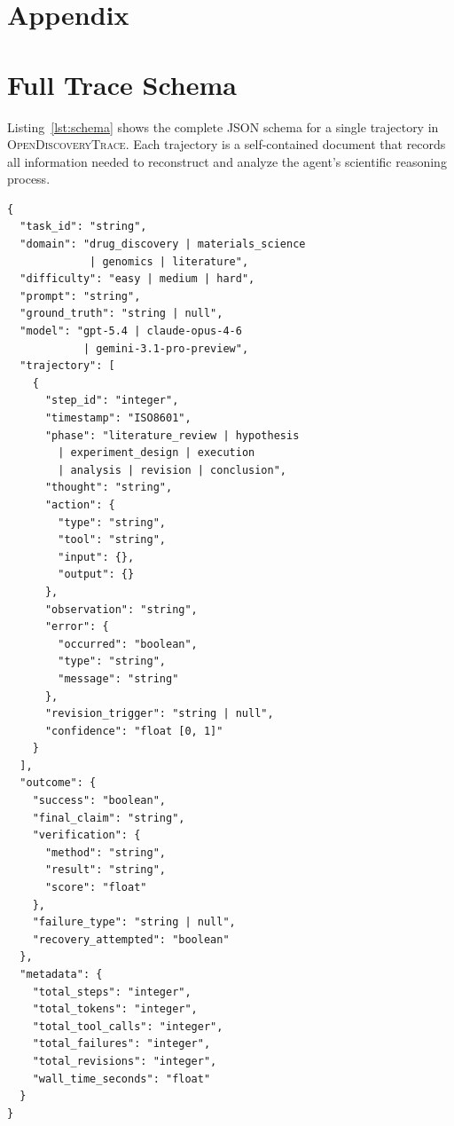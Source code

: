 \documentclass{article}
\newcommand{\dataset}{\textsc{OpenDiscoveryTrace}\xspace}
\begin{document}



\clearpage
\onecolumn
\appendix
\section*{Appendix}
\setcounter{section}{0}
\renewcommand{\thesection}{\Alph{section}}

\section{Full Trace Schema}
\label{app:schema}

Listing~\ref{lst:schema} shows the complete JSON schema for a single trajectory in \dataset. Each trajectory is a self-contained document that records all information needed to reconstruct and analyze the agent's scientific reasoning process.

\begin{lstlisting}[style=json, caption={Complete \dataset trace schema (abbreviated for space).}, label=lst:schema]
{
  "task_id": "string",
  "domain": "drug_discovery | materials_science
             | genomics | literature",
  "difficulty": "easy | medium | hard",
  "prompt": "string",
  "ground_truth": "string | null",
  "model": "gpt-5.4 | claude-opus-4-6
            | gemini-3.1-pro-preview",
  "trajectory": [
    {
      "step_id": "integer",
      "timestamp": "ISO8601",
      "phase": "literature_review | hypothesis
        | experiment_design | execution
        | analysis | revision | conclusion",
      "thought": "string",
      "action": {
        "type": "string",
        "tool": "string",
        "input": {},
        "output": {}
      },
      "observation": "string",
      "error": {
        "occurred": "boolean",
        "type": "string",
        "message": "string"
      },
      "revision_trigger": "string | null",
      "confidence": "float [0, 1]"
    }
  ],
  "outcome": {
    "success": "boolean",
    "final_claim": "string",
    "verification": {
      "method": "string",
      "result": "string",
      "score": "float"
    },
    "failure_type": "string | null",
    "recovery_attempted": "boolean"
  },
  "metadata": {
    "total_steps": "integer",
    "total_tokens": "integer",
    "total_tool_calls": "integer",
    "total_failures": "integer",
    "total_revisions": "integer",
    "wall_time_seconds": "float"
  }
}
\end{lstlisting}
\end{document}
